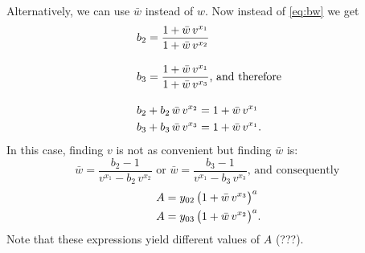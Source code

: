 \documentclass[12pt]{article}
\theoremstyle{remark}
\begin{document}
Alternatively, we can use $\bar{w}$ instead of $w$. Now instead of
\eqref{eq:bw} we get
\begin{align}
  &b_2 = \frac{1 + \bar{w} \, v^{x_1}}{1 + \bar{w} \, v^{x_2}} \notag
  \\[1em]
  &b_3 = \frac{1 + \bar{w} \, v^{x_1}}{1 + \bar{w} \, v^{x_3}} \text{,
    and therefore} \\[1em]
  &b_2 + b_2 \, \bar{w} \, v^{x_2} = 1 + \bar{w} \, v^{x_1} \notag \\
  &b_3 + b_3 \, \bar{w} \, v^{x_3} = 1 + \bar{w} \, v^{x_1}.
\end{align}
In this case, finding $v$ is not as convenient but finding $\bar{w}$
is:
\begin{equation} \label{eq:barw}
  \bar{w} = \frac{b_2 - 1}{v^{x_1} - b_2 \, v^{x_2}} \text{ or }
  \bar{w} = \frac{b_3 - 1}{v^{x_1} - b_3 \, v^{x_3}} \text{, and consequently }  
\end{equation}
\begin{align}
  A &= y_{02} \, \big(1 + \bar{w} \, v^{x_3}\big)^a \notag \\
  A &= y_{03} \, \big(1 + \bar{w} \, v^{x_2}\big)^a. 
\end{align}
Note that these expressions yield different values of $A$ {\color{blue}
  (???)}. \\
\end{document}
